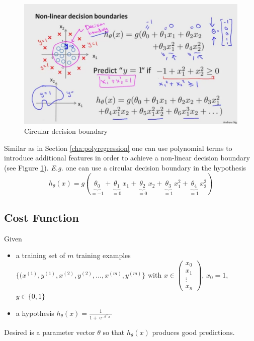 \documentclass[a4paper,twoside,10pt]{article}
\begin{document}
\begin{figure}[htbp]
  \begin{center}
    \includegraphics[width=.6\textwidth]{circularboundary}
    \caption{Circular decision boundary\label{fig:circularboundary}}
  \end{center}
\end{figure}
Similar as in Section \ref{cha:polyregression} one can use polynomial terms to introduce additional features in order to achieve a non-linear decision boundary (see Figure \ref{fig:circularboundary}). \emph{E.g.} one can use a circular decision boundary in the hypothesis
\begin{equation*}
  h_\theta(x)=g(\underbrace{\theta_0}_{=-1}+\underbrace{\theta_1}_{=0}\,x_1+\underbrace{\theta_2}_{=0}\,x_2+\underbrace{\theta_3}_{=1}\,x_1^2+\underbrace{\theta_4}_{=1}\,x_2^2)
\end{equation*}

\subsection{Cost Function}
Given
\begin{itemize}
\item a training set of $m$ training examples $\{(x^{(1)},y^{(1)},x^{(2)},y^{(2)},\ldots,x^{(m)},y^{(m)}\}$ with
$x\in\begin{pmatrix}x_0\\x_1\\\vdots\\x_n\end{pmatrix}$, $x_0=1$, $y\in\{0,1\}$
\item a hypothesis $h_\theta(x)=\displaystyle\frac{1}{1+\operatorname{e}^{-\theta^\top x}}$
\end{itemize}
Desired is a parameter vector $\theta$ so that $h_\theta(x)$ produces good predictions.
\end{document}
